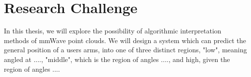 \section{Research Challenge}
\label{section: introduction - research challenge}

In this thesis, we will explore the possibility of algorithmic interpretation methods of mmWave point clouds.
We will design a system which can predict the general position of a users arms, into one of three distinct regions, "low", meaning angled at ...., "middle", which is the region of angles ...., and high, given the region of angles ....

